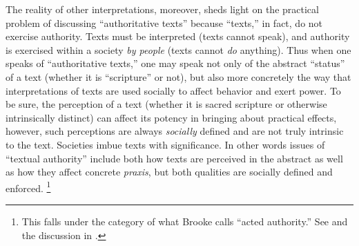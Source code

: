The reality of other interpretations, moreover, sheds light on the practical problem of discussing ``authoritative texts'' because ``texts,'' in fact, do not exercise authority. Texts must be interpreted (texts cannot speak), and authority is exercised within a society \emph{by people} (texts cannot \emph{do} anything). Thus when one speaks of ``authoritative texts,'' one may speak not only of the abstract ``status'' of a text (whether it is ``scripture'' or not), but also more concretely the way that interpretations of texts are used socially to affect behavior and exert power.\autocite{foucault_ci1982} To be sure, the perception of a text (whether it is sacred scripture or otherwise intrinsically distinct) can affect its potency in bringing about practical effects, however, such perceptions are always \emph{socially} defined and are not truly intrinsic to the text. Societies imbue texts with significance. In other words issues of ``textual authority'' include both how texts are perceived in the abstract as well as how they affect concrete \emph{praxis}, but both qualities are socially defined and enforced.%
    \footnote{This falls under the category of what Brooke calls ``acted authority.'' See \cite[519--523]{brooke_rev-qumran2012} and the discussion in \cite[475]{debel_jsj2014}.}

